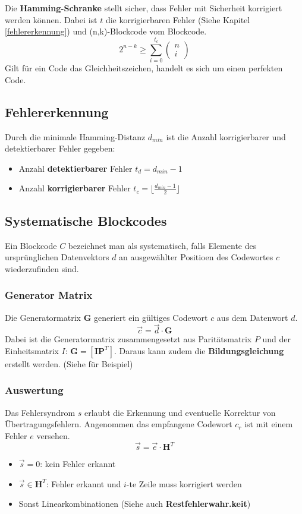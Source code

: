 \noindent Die \textbf{Hamming-Schranke}  stellt sicher, dass Fehler mit Sicherheit korrigiert werden können. Dabei ist $t$ die korrigierbaren Fehler (Siehe Kapitel \ref{fehlererkennung}) und (n,k)-Blockcode vom Blockcode.
\[
2^{n-k} \ge \sum_{i=0}^{t_c}\begin{pmatrix}
	n \\ i
\end{pmatrix}
\]
Gilt für ein Code das Gleichheitszeichen, handelt es sich um einen perfekten Code.

\subsection{Fehlererkennung}\label{fehlererkennung}
Durch die minimale Hamming-Distanz $d_{min}$ ist die Anzahl korrigierbarer und detektierbarer Fehler gegeben:
\begin{itemize}[nosep]
	\item Anzahl \textbf{detektierbarer} Fehler $t_d = d_{min} - 1$
	\item Anzahl \textbf{korrigierbarer} Fehler $t_c =\lfloor \frac{d_{min} - 1}{2}\rfloor$
\end{itemize}

\subsection{Systematische Blockcodes}
 Ein Blockcode $C$ bezeichnet man als systematisch, falls Elemente des ursprünglichen Datenvektors $d$ an ausgewählter Positioen des Codewortes $c$ wiederzufinden sind.

\subsubsection{Generator Matrix}
Die Generatormatrix $\mathbf{G}$ generiert ein gültiges Codewort $c$ aus dem Datenwort $d$.
\[
\vec{c} = \vec{d} \cdot \mathbf{G}
\]
Dabei ist die Generatormatrix zusammengesetzt aus Paritätsmatrix $P$ und der Einheitsmatrix $I$: $\mathbf{G} = [ \mathbf{I} \mathbf{P}^T ]$. Daraus kann zudem die \textbf{Bildungsgleichung} erstellt werden. (Siehe  für Beispiel)


\subsubsection{Auswertung}
Das Fehlersyndrom $s$ erlaubt die Erkennung und eventuelle Korrektur von Übertragungsfehlern. Angenommen das empfangene Codewort $c_r$ ist mit einem Fehler $e$ versehen.
\[
\vec{s} = \vec{e} \cdot \mathbf{H}^T
\]
\begin{itemize}[nosep]
	\item $\vec{s} = 0$: kein Fehler erkannt
	\item $\vec{s} \in \mathbf{H}^T$: Fehler erkannt und $i$-te Zeile muss korrigiert werden
	\item Sonst Linearkombinationen (Siehe auch  \textbf{Restfehlerwahr.keit})
\end{itemize}


